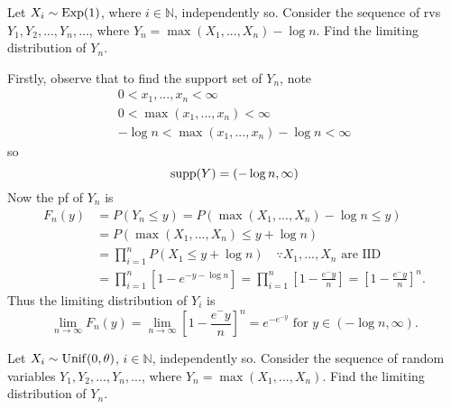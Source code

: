 \documentclass[notoc,notitlepage]{tufte-book}
\begin{document}
\begin{eg}
  Let $X_i \sim \operatorname{Exp}(1)$, where $i \in \mathbb{N}$, independently so. Consider the sequence of rvs $Y_1, Y_2, ..., Y_n, ...$, where $Y_n = \max( X_1, ..., X_n ) - \log n$. Find the limiting distribution of $Y_n$.
\end{eg}

\begin{solution}
  Firstly, observe that to find the support set of $Y_n$, note
  \begin{gather*}
    0 < x_1, ..., x_n < \infty \\
    0 < \max( x_1, ..., x_n ) < \infty \\
    -\log n < \max( x_1, ..., x_n ) - \log n < \infty
  \end{gather*}
  so
  \begin{equation*}
    \operatorname{supp}(Y) = (- \log n, \infty)
  \end{equation*}
  Now the pf of $Y_n$ is
  \begin{align*}
    F_n(y) &= P(Y_n \leq y) = P( \max(X_1, ..., X_n) - \log n \leq y ) \\
           &= P( \max(X_1, ..., X_n) \leq y + \log n ) \\
           &= \prod_{i=1}^{n} P(X_1 \leq y + \log n) \quad \because X_1, ..., X_n \text{ are IID } \\
           &= \prod_{i=1}^{n} \left[ 1 - e^{- y - \log n} \right] = \prod_{i=1}^{n} \left[ 1 - \frac{e^-y}{n} \right] = \left[ 1 - \frac{e^-y}{n} \right]^n.
  \end{align*}
  Thus the limiting distribution of $Y_i$ is
  \begin{equation*}
    \lim_{n \to \infty} F_n(y) = \lim_{n \to \infty} \left[ 1 - \frac{e^-y}{n} \right]^n = e^{-e^{-y}} \text{ for } y \in ( -\log n, \infty ).
  \end{equation*}
\end{solution}

\begin{eg}
  Let $X_i \sim \operatorname{Unif}(0, \theta)$, $i \in \mathbb{N}$, independently so. Consider the sequence of random variables $Y_1, Y_2, ..., Y_n, ...$, where $Y_n = \max(X_1, ..., X_n)$. Find the limiting distribution of $Y_n$.
\end{eg}
\end{document}
